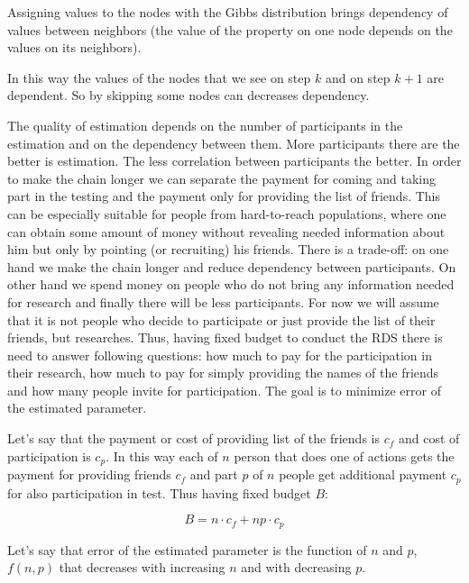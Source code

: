 \documentclass[12pt]{report}
\begin{document}
Assigning values to the nodes with the Gibbs distribution brings dependency of values between neighbors (the value of the property on one node depends on the values on its neighbors).

In this way the values of the nodes that we see on step $k$ and on step $k + 1$ are dependent. So by skipping some nodes can decreases dependency. 


The quality of estimation depends on the number of participants in the estimation and on the dependency between them. More participants there are the better is estimation. The less correlation between participants the better.
In order to make the chain longer we can separate the payment for coming and taking part in the testing and the payment only for providing the list of friends.
This can be especially suitable for people from hard-to-reach populations, where one can obtain some amount of money without revealing needed information about him but only by pointing (or recruiting) his friends. There is a trade-off: on one hand we make the chain longer and reduce dependency between participants. On other hand we spend money on people who do not bring any information needed for research and finally there will be less participants. 
For now we will assume that it is not people who decide to participate or just provide the list of their friends, but researches. Thus, having fixed budget to conduct the RDS there is need to answer following questions: how much to pay for the participation in their research, how much to pay for simply providing the names of the friends and how many people invite for participation. The goal is to minimize error of the estimated parameter.

Let's say that the payment or cost of providing list of the friends is $c_f$ and cost of participation is $c_p$. In this way each of $n$ person that does one of actions gets the payment for providing friends $c_f$ and part $p$ of $n$ people get additional payment $c_p$ for also participation in test.
Thus having fixed budget $B$:

$$B = n \cdot c_f + np \cdot c_p$$

Let's say that error of the estimated parameter is the function of $n$ and $p$, $f(n,p)$ that decreases with increasing $n$ and with decreasing $p$.
\end{document}
